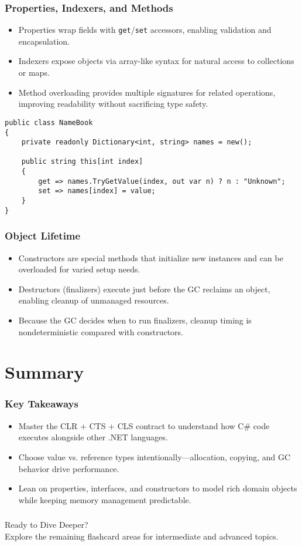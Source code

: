 \documentclass[aspectratio=169]{beamer}
\newcommand{\code}[1]{\texttt{#1}}
\newcommand{\ProgressStep}[1]{\progressstep{#1}}
\newcommand{\ThisFrameTitle}[1]{\frametitle{#1}}
\begin{document}
\begin{frame}[fragile]
  \ProgressStep{8}\ThisFrameTitle{Properties, Indexers, and Methods}
  \begin{itemize}
    \item Properties wrap fields with \code{get}/\code{set} accessors, enabling validation and encapsulation.
    \item Indexers expose objects via array-like syntax for natural access to collections or maps.
    \item Method overloading provides multiple signatures for related operations, improving readability without sacrificing type safety.
  \end{itemize}
  \vspace{0.6em}
  \begin{verbatim}
public class NameBook
{
    private readonly Dictionary<int, string> names = new();

    public string this[int index]
    {
        get => names.TryGetValue(index, out var n) ? n : "Unknown";
        set => names[index] = value;
    }
}
  \end{verbatim}
\end{frame}

\begin{frame}
  \ProgressStep{9}\ThisFrameTitle{Object Lifetime}
  \begin{itemize}
    \item Constructors are special methods that initialize new instances and can be overloaded for varied setup needs.
    \item Destructors (finalizers) execute just before the GC reclaims an object, enabling cleanup of unmanaged resources.
    \item Because the GC decides when to run finalizers, cleanup timing is nondeterministic compared with constructors.
  \end{itemize}
\end{frame}

\section{Summary}
\begin{frame}
  \ProgressStep{-1}\ThisFrameTitle{Key Takeaways}
  \begin{itemize}
    \item Master the CLR + CTS + CLS contract to understand how C\# code executes alongside other .NET languages.
    \item Choose value vs. reference types intentionally—allocation, copying, and GC behavior drive performance.
    \item Lean on properties, interfaces, and constructors to model rich domain objects while keeping memory management predictable.
  \end{itemize}
\end{frame}

\begin{frame}
  \ProgressStep{-1}\ThisFrameTitle{}
  \begin{center}
    \LARGE Ready to Dive Deeper?\\[2mm]
    \large Explore the remaining flashcard areas for intermediate and advanced topics.
  \end{center}
\end{frame}
\end{document}
